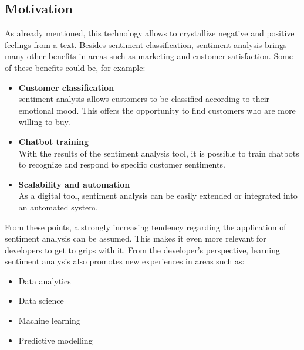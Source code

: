 \subsection{Motivation}
As already mentioned, this technology allows to crystallize negative and positive feelings from a text. Besides sentiment classification, sentiment analysis brings many other benefits in areas such as marketing and customer satisfaction. Some of these benefits could be, for example:

\begin{itemize}
\item \textbf{Customer classification}\\
sentiment analysis allows customers to be classified according to their emotional mood. This offers the opportunity to find customers who are more willing to buy.
\item \textbf{Chatbot training}\\
With the results of the sentiment analysis tool, it is possible to train chatbots to recognize and respond to specific customer sentiments.
\item \textbf{Scalability and automation}\\
As a digital tool, sentiment analysis can be easily extended or integrated into an automated system.
\end{itemize}

From these points, a strongly increasing tendency regarding the application of sentiment analysis can be assumed. This makes it even more relevant for developers to get to grips with it. From the developer's perspective, learning sentiment analysis also promotes new experiences in areas such as: 

\begin{itemize}
\item Data analytics
\item Data science
\item Machine learning
\item Predictive modelling
\end{itemize}

